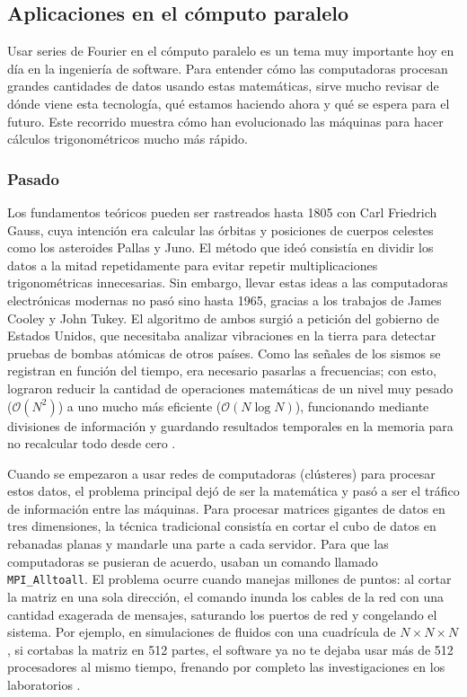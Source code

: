 \subsection{Aplicaciones en el cómputo paralelo}
\label{sec:cap01:marco-teorico:computo-paralelo}

Usar series de Fourier en el cómputo paralelo es un tema muy importante hoy en día en la ingeniería de software. Para entender cómo las computadoras procesan grandes cantidades de datos usando estas matemáticas, sirve mucho revisar de dónde viene esta tecnología, qué estamos haciendo ahora y qué se espera para el futuro. Este recorrido muestra cómo han evolucionado las máquinas para hacer cálculos trigonométricos mucho más rápido.

\subsubsection{Pasado}

Los fundamentos teóricos pueden ser rastreados hasta 1805 con Carl Friedrich Gauss, cuya intención era calcular las órbitas y posiciones de cuerpos celestes como los asteroides Pallas y Juno. El método que ideó consistía en dividir los datos a la mitad repetidamente para evitar repetir multiplicaciones trigonométricas innecesarias. Sin embargo, llevar estas ideas a las computadoras electrónicas modernas no pasó sino hasta 1965, gracias a los trabajos de James Cooley y John Tukey. El algoritmo de ambos surgió a petición del gobierno de Estados Unidos, que necesitaba analizar vibraciones en la tierra para detectar pruebas de bombas atómicas de otros países. Como las señales de los sismos se registran en función del tiempo, era necesario pasarlas a frecuencias; con esto, lograron reducir la cantidad de operaciones matemáticas de un nivel muy pesado ($\mathcal{O}(N^2)$) a uno mucho más eficiente ($\mathcal{O}(N \log N)$), funcionando mediante divisiones de información y guardando resultados temporales en la memoria para no recalcular todo desde cero \cite{wikipedia:cooley-tukey-fft}.

Cuando se empezaron a usar redes de computadoras (clústeres) para procesar estos datos, el problema principal dejó de ser la matemática y pasó a ser el tráfico de información entre las máquinas. Para procesar matrices gigantes de datos en tres dimensiones, la técnica tradicional consistía en cortar el cubo de datos en rebanadas planas y mandarle una parte a cada servidor. Para que las computadoras se pusieran de acuerdo, usaban un comando llamado \texttt{MPI\_Alltoall}. El problema ocurre cuando manejas millones de puntos: al cortar la matriz en una sola dirección, el comando inunda los cables de la red con una cantidad exagerada de mensajes, saturando los puertos de red y congelando el sistema. Por ejemplo, en simulaciones de fluidos con una cuadrícula de $N \times N \times N$, si cortabas la matriz en 512 partes, el software ya no te dejaba usar más de 512 procesadores al mismo tiempo, frenando por completo las investigaciones en los laboratorios \cite{pippig:pfft:2012}.

